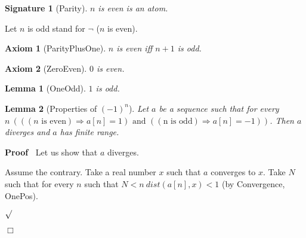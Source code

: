 \documentclass{article}
\newenvironment{forthel}{\begin{leftbar}}{\end{leftbar}}
\newenvironment{proof}{\noindent\textbf{Proof\ }}{\hspace*{\fill}$\Box$\medskip}
\newenvironment{subproof}{\begin{list}{}{}
		\item[\text{Proof}]}{\hfill $\surd$ \end{list}}
\newtheorem{axiom}{Axiom}
\newtheorem{lemma}{Lemma}
\newtheorem{signature}{Signature}
\begin{document}
\begin{forthel}
	\begin{signature}[Parity]
	$n$ is even is an atom.
	\end{signature}
	
	\noindent Let $n$ is odd stand for $\neg$ ($n$ is even).
	
	\begin{axiom}[ParityPlusOne]
	$n$ is even iff $n + 1$ is odd.
	\end{axiom}

	\begin{axiom}[ZeroEven]
	$0$ is even.
	\end{axiom}
	
	\begin{lemma}[OneOdd]
	$1$ is odd.
	\end{lemma} 
	
	\begin{lemma}[Properties of $(-1)^{n}$]
		Let $a$ be a sequence such that for every $n \ (((n \text{ is even}) \Rightarrow a[n] = 1) \text{ and } ((\text{n is odd}) \Rightarrow a[n] = -1))$.
		Then $a$ diverges and $a$ has finite range.
	\end{lemma}
	\begin{proof}
		Let us show that $a$ diverges.
		\begin{subproof}
			Assume the contrary.
			Take a real number $x$ such that $a$ converges to $x$.
			Take $N$ such that for every $n$ such that $N < n \ dist(a[n],x) < 1$ (by Convergence, OnePos).
			

\end{subproof}
\end{proof}
\end{forthel}
\end{document}
